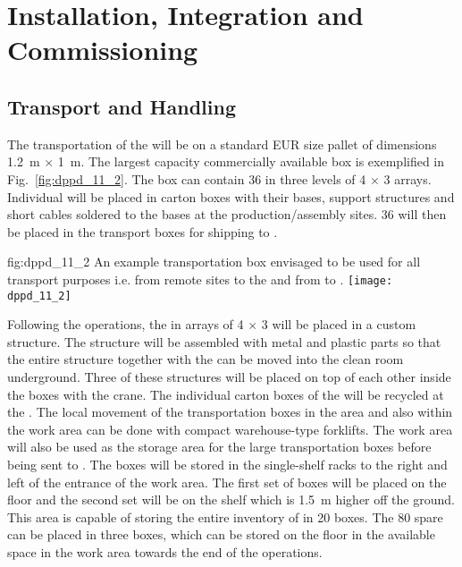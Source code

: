 \section{Installation, Integration and Commissioning}
\label{sec:dp-pds-installation}

\subsection{Transport and Handling}

The transportation of the  will be on a standard EUR size pallet of dimensions \SI{1.2}{\m} $\times$ \SI{1}{\m}. The largest capacity commercially available box is exemplified in Fig.~\ref{fig:dppd_11_2}. The box can contain \num{36}  in three levels of \num{4} $\times$ \num{3} arrays. Individual  will be placed in carton boxes with their bases, support structures and short  cables soldered to the bases at the production/assembly sites. \num{36}  will then be placed in the transport boxes for shipping to .

\begin{dunefigure}{fig:dppd_11_2}
{An example transportation box envisaged to be used for all transport purposes i.e. from remote sites to the  and from  to \surf.}
\texttt{[image: dppd\_11\_2]}
\end{dunefigure}

Following the  operations, the  in arrays of \num{4} $\times$ \num{3} will be placed in a custom structure. The structure will be assembled with metal and plastic parts so that the entire structure together with the  can be moved into the clean room underground. Three of these structures will be placed on top of each other inside the boxes with the crane. The individual carton boxes of the  will be recycled at the . The local movement of the transportation boxes in the  area and also within the \dual {} work area can be done with compact warehouse-type forklifts. The  work area will also be used as the storage area for the large  transportation boxes before being sent to \surf. The boxes will be stored in the single-shelf racks to the right and left of the entrance of the work area. The first set of boxes will be placed on the floor and the second set will be on the shelf which is \SI{1.5}{\m} higher off the ground. This area is capable of storing the entire \dual {}  inventory of \dpnumpmtch {} in \num{20} boxes. The \num{80} spare  can be placed in three boxes, which can be stored on the floor in the available space in the work area towards the end of the \dual {}  operations.

